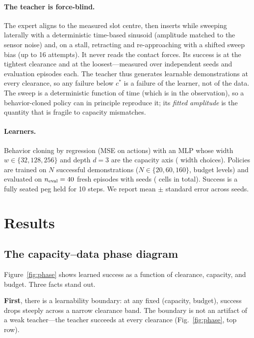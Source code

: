 \documentclass[11pt]{article}
\begin{document}
\paragraph{The teacher is force-blind.}
The expert aligns to the measured slot centre, then inserts while sweeping
laterally with a deterministic time-based sinusoid (amplitude matched to the
sensor noise) and, on a stall, retracting and re-approaching with a shifted
sweep bias (up to 16 attempts). It never reads the contact forces. Its
success is \TLteacherTight{} at the tightest clearance and \TLteacherLoose{}
at the loosest---measured over \TLtenSeed{} independent seeds and
\TLevalEp{} evaluation episodes each. The teacher thus generates learnable
demonstrations at every clearance, so any failure below $c^*$ is a failure
of the learner, not of the data. The sweep is a deterministic function of
time (which is in the observation), so a behavior-cloned policy can in
principle reproduce it; its \emph{fitted amplitude} is the quantity that is
fragile to capacity mismatches.

\paragraph{Learners.}
Behavior cloning by regression (MSE on actions) with an MLP whose width
$w \in \{32, 128, 256\}$ and depth $d = 3$ are the capacity axis
(\TLwidths{} width choices). Policies are trained on $N$ successful
demonstrations ($N \in \{20, 60, 160\}$, \TLbudgets{} budget levels) and
evaluated on $n_{\mathrm{eval}} = 40{}$ fresh episodes with
\TLtenSeed{} seeds (\TLcells{} cells in total). Success is a fully seated
peg held for 10 steps. We report mean $\pm$ standard error across seeds.

\section{Results}

\subsection{The capacity--data phase diagram}

Figure~\ref{fig:phase} shows learned success as a function of clearance,
capacity, and budget. Three facts stand out.

\textbf{First}, there is a learnability boundary: at any fixed (capacity,
budget), success drops steeply across a narrow clearance band. The boundary
is not an artifact of a weak teacher---the teacher succeeds at every
clearance (Fig.~\ref{fig:phase}, top row).
\end{document}
